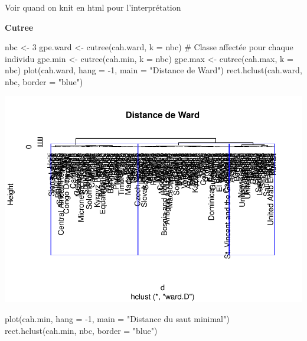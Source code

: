\documentclass[
]{article}
\newenvironment{Shaded}{}{}
\newcommand{\AttributeTok}[1]{#1}
\newcommand{\CommentTok}[1]{\textcolor[rgb]{0.00,0.50,0.00}{#1}}
\newcommand{\DecValTok}[1]{#1}
\newcommand{\FunctionTok}[1]{#1}
\newcommand{\NormalTok}[1]{#1}
\newcommand{\OtherTok}[1]{\textcolor[rgb]{1.00,0.25,0.00}{#1}}
\newcommand{\SpecialCharTok}[1]{\textcolor[rgb]{0.00,0.50,0.50}{#1}}
\newcommand{\StringTok}[1]{\textcolor[rgb]{0.00,0.50,0.50}{#1}}
\begin{document}
Voir quand on knit en html pour l'interprétation

\textbf{Cutree}

\begin{Shaded}
\begin{Highlighting}[]
\NormalTok{nbc }\OtherTok{\textless{}{-}} \DecValTok{3}
\NormalTok{gpe.ward }\OtherTok{\textless{}{-}} \FunctionTok{cutree}\NormalTok{(cah.ward, }\AttributeTok{k =}\NormalTok{ nbc) }\CommentTok{\# Classe affectée pour chaque individu}
\NormalTok{gpe.min }\OtherTok{\textless{}{-}} \FunctionTok{cutree}\NormalTok{(cah.min, }\AttributeTok{k =}\NormalTok{ nbc)}
\NormalTok{gpe.max }\OtherTok{\textless{}{-}} \FunctionTok{cutree}\NormalTok{(cah.max, }\AttributeTok{k =}\NormalTok{ nbc)}
\FunctionTok{plot}\NormalTok{(cah.ward, }\AttributeTok{hang =} \SpecialCharTok{{-}}\DecValTok{1}\NormalTok{, }\AttributeTok{main =} \StringTok{"Distance de Ward"}\NormalTok{)}
\FunctionTok{rect.hclust}\NormalTok{(cah.ward, nbc, }\AttributeTok{border =} \StringTok{"blue"}\NormalTok{)}
\end{Highlighting}
\end{Shaded}

\includegraphics{Projet_files/figure-latex/unnamed-chunk-19-1.pdf}

\begin{Shaded}
\begin{Highlighting}[]
\FunctionTok{plot}\NormalTok{(cah.min, }\AttributeTok{hang =} \SpecialCharTok{{-}}\DecValTok{1}\NormalTok{, }\AttributeTok{main =} \StringTok{"Distance du saut minimal"}\NormalTok{)}
\FunctionTok{rect.hclust}\NormalTok{(cah.min, nbc, }\AttributeTok{border =} \StringTok{"blue"}\NormalTok{)}
\end{Highlighting}
\end{Shaded}
\end{document}
